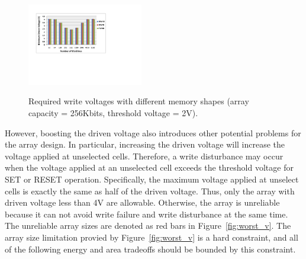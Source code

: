 \begin{figure}%
\centering
  \includegraphics[width=0.45\textwidth]{./figures/shape_f.pdf}\\
  \caption{Required write voltages with different memory shapes (array capacity = 256Kbits, threshold voltage = 2V).}\label{fig:shape}
    \vspace{-15pt}
\end{figure}

However, boosting the driven voltage also introduces other potential
problems for the array design. In particular, increasing the driven voltage will
increase the voltage applied at unselected cells. Therefore, a write
disturbance may occur when the voltage applied at an unselected cell
exceeds the threshold voltage for SET or RESET operation. Specifically,
the maximum voltage applied at unselect cells is exactly the same as half
of the driven voltage. Thus, only the array with driven voltage less than
4V are allowable.  Otherwise, the array is unreliable because it can not
avoid write failure and write disturbance at the same time. The unreliable
array sizes are denoted as red bars in Figure~\ref{fig:worst_v}. The array
size limitation provied by Figure~\ref{fig:worst_v} is a hard constraint,
and all of the following energy and area tradeoffs should be bounded by
this constraint.





